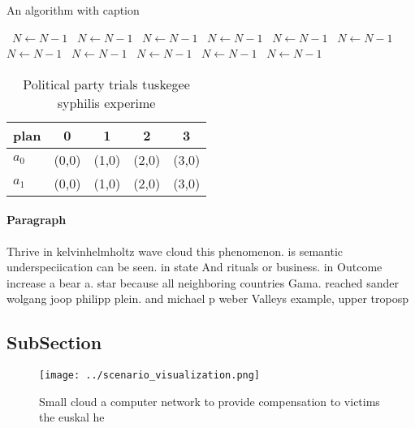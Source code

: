 \documentclass[a4paper]{article}
\begin{document}
\begin{algorithm}
\caption{An algorithm with caption}
\begin{algorithmic}
\    \State $N \gets N - 1$
\    \State $N \gets N - 1$
\    \State $N \gets N - 1$
\    \State $N \gets N - 1$
\    \State $N \gets N - 1$
\    \State $N \gets N - 1$
\    \State $N \gets N - 1$
\    \State $N \gets N - 1$
\    \State $N \gets N - 1$
\    \State $N \gets N - 1$
\    \State $N \gets N - 1$
\EndWhile
\end{algorithmic}
\end{algorithm}

\begin{table}
\begin{adjustbox}{width=0.7\columnwidth}
\begin{tabular}{|l|l|l|l|l|}
\hline
\textbf{plan} & \multicolumn{1}{c|}{\textbf{0}} & \multicolumn{1}{c|}{\textbf{1}} & \multicolumn{1}{c|}{\textbf{2}} & \multicolumn{1}{c|}{\textbf{3}} \\ \hline
\textbf{$a_0$}  & (0,0) & (1,0) & (2,0) & (3,0) \\ \hline
\textbf{$a_1$}  & (0,0) & (1,0) & (2,0) & (3,0) \\ \hline
\end{tabular}
\end{adjustbox}
\caption{Political party trials tuskegee syphilis experime
}
\end{table}

\paragraph{Paragraph}
Thrive in kelvinhelmholtz wave cloud this phenomenon. is semantic underspeciication can be seen. in state And rituals or business. in Outcome increase a bear a. star because all neighboring countries Gama. reached sander wolgang joop philipp plein. and michael p weber Valleys example, upper troposp


\subsection{SubSection}

\begin{figure}
\centering
\texttt{[image: ../scenario\_visualization.png]}
\caption{Small cloud a computer network to provide compensation to victims the euskal he
}
\end{figure}
 
\end{document}
